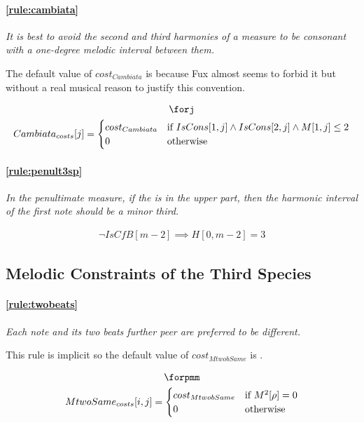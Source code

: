 \paragraph{\ref{rule:cambiata}} \textit{It is best to avoid the second and third harmonies of a measure to be consonant with a one-degree melodic interval between them.}

The default value of $cost_{Cambiata}$ is  because Fux almost seems to forbid it but without a real musical reason to justify this convention.

\begin{equation}
    \begin{gathered}
        \forj\\
        Cambiata_{costs}[j] = \begin{cases}
            cost_{Cambiata} & \text{if } IsCons[1, j] \land IsCons[2, j] \land M[1, j] \leq 2\\
            0 & \text{otherwise}
        \end{cases}
    \end{gathered}
\end{equation}

\paragraph{\ref{rule:penult3sp}} \textit{In the penultimate measure, if the \cf is in the upper part, then the harmonic interval of the first note should be a minor third.}

\begin{equation}
    \begin{gathered}
        \lnot IsCfB[m-2] \implies H[0, m-2] = 3
    \end{gathered}
\end{equation}

\subsection{Melodic Constraints of the Third Species}
\paragraph{\ref{rule:twobeats}} \textit{Each note and its two beats further peer are preferred to be different.}

This rule is implicit so the default value of $cost_{MtwobSame}$ is .

\begin{equation}
    \begin{gathered}
        \forpmm \\
        MtwoSame_{costs}[i, j] = \begin{cases}
            cost_{MtwobSame} & \text{if } M^2[\rho] = 0\\
            0 & \text{otherwise}
        \end{cases}
    \end{gathered}
\end{equation}

